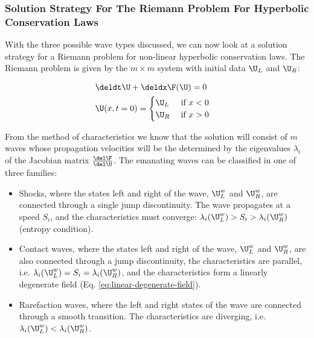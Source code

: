 \subsubsection{Solution Strategy For The Riemann Problem For Hyperbolic Conservation Laws}

With the three possible wave types discussed, we can now look at a solution strategy for a Riemann
problem for non-linear hyperbolic conservation laws. The Riemann problem is given by the $m \times
m$ system with initial data $\U_L$ and $\U_R$:

\begin{align}
    & \deldt \U + \deldx \F(\U) = 0 && \\
    & \U(x, t=0) = \begin{cases}
                    \U_L & \text{ if } x < 0 \\
                    \U_R & \text{ if } x > 0
                   \end{cases}
\end{align}

From the method of characteristics we know that the solution will consist of $m$ waves whose
propagation velocities will be the determined by the eigenvalues $\lambda_i$ of the Jacobian matrix
$\frac{\del \F}{\del \U}$.
The emanating waves can be classified in one of three families:

\begin{itemize}
    \item Shocks, where the states left and right of the wave, $\U_L^{w}$ and $\U_R^{w}$, are
connected through a single jump discontinuity. The wave propagates at a speed $S_i$, and the
characteristics must converge: $\lambda_i(\U_L^w) > S_i > \lambda_i(\U_R^{w})$ (entropy condition).
    \item Contact waves, where the states left and right of the wave,  $\U_L^{w}$ and $\U_R^{w}$,
are also connected through a jump discontinuity, the characteristics are parallel, i.e.
$\lambda_i(\U_L^w) = S_i = \lambda_i(\U_R^{w})$, and the characteristics form a linearly degenerate
field (Eq. \ref{eq:linear-degenerate-field}).
    \item Rarefaction waves, where the left and right states of the wave are connected through a
smooth transition. The characteristics are diverging, i.e.  $\lambda_i(\U_L^w) <
\lambda_i(\U_R^{w})$.
\end{itemize}

